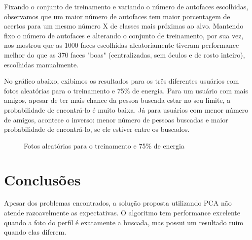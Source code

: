 \documentclass[10pt,a4paper]{article}
\begin{document}
Fixando o conjunto de treinamento e variando o número de autofaces escolhidas, observamos que um maior número de autofaces tem maior porcentagem de acertos para um mesmo número X de classes mais próximas ao alvo. Mantendo fixo o número de autofaces e alterando o conjunto de treinamento, por sua vez, nos mostrou que as 1000 faces escolhidas aleatoriamente tiveram performance melhor do que as 370 faces "boas" (centralizadas, sem óculos e de rosto inteiro), escolhidas manualmente.

No gráfico abaixo, exibimos os resultados para os três diferentes usuários com fotos aleatórias para o treinamento e 75\% de energia. Para um usuário com mais amigos, apesar de ter mais chance da pessoa buscada estar no seu limite, a probabilidade de encontrá-lo é muito baixa. Já para usuários com menor número de amigos, acontece o inverso: menor número de pessoas buscadas e maior probabilidade de encontrá-lo, se ele estiver entre os buscados.

\begin{figure}
\begin{center}
\end{center}
\caption{Fotos aleatórias para o treinamento e 75\% de energia}
\end{figure}

\section{Conclusões}

Apesar dos problemas encontrados, a solução proposta utilizando PCA
não atende razoavelmente as expectativas. O algoritmo tem performance
excelente quando a foto do perfil é exatamente a buscada, mas possui
um resultado ruim quando elas diferem.
\end{document}
